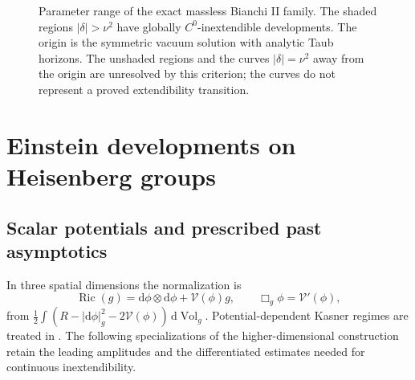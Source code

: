 \documentclass[10pt,a4paper]{article}
\numberwithin{equation}{section}
\theoremstyle{definition}
\theoremstyle{remark}
\newcommand{\dd}{\mathrm d}
\newcommand{\Vol}{\operatorname{Vol}}
\newcommand{\Ric}{\operatorname{Ric}}
\begin{document}
\begin{figure}[tb]
\centering
{}
\caption{Parameter range of the exact massless Bianchi II family.
The shaded regions $|\delta|>\nu^2$ have globally $C^0$-inextendible
developments.  The origin is the symmetric vacuum solution with analytic
Taub horizons.  The unshaded regions and the curves
$|\delta|=\nu^2$ away from the origin are unresolved by this criterion;
the curves do not represent a proved extendibility transition.}
\label{fig:scalar-parameter-range}
\end{figure}

\section{Einstein developments on Heisenberg groups}
\label{sec:scalar-potentials}

\subsection{Scalar potentials and prescribed past asymptotics}

In three spatial dimensions the normalization is
\begin{equation}
 \Ric(g)=\dd\phi\otimes\dd\phi+\mathcal V(\phi)g,
 \qquad \Box_g\phi=\mathcal V'(\phi),
 \label{eq:potential-equations}
\end{equation}
from $\frac12\int(R-|\dd\phi|_g^2-2\mathcal V(\phi))\,\dd\Vol_g$.
Potential-dependent Kasner regimes are treated in
\cite{Ritchie2022,Ringstrom2025}.  The following specializations of
the higher-dimensional construction retain the leading amplitudes
and the differentiated estimates needed for continuous
inextendibility.
\end{document}
